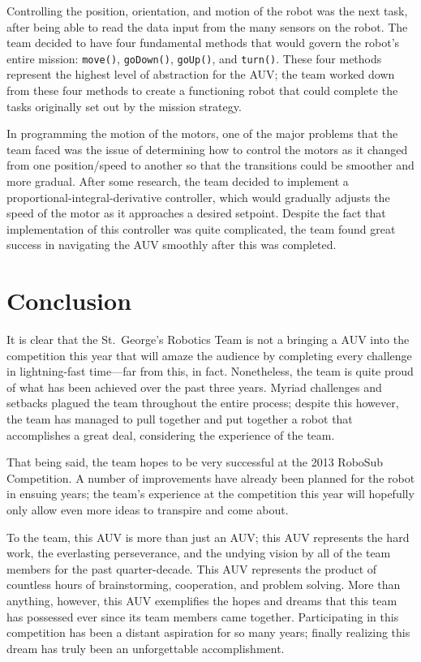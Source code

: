 \documentclass[12pt, letterpaper, twocolumn, titlepage]{article}
\begin{document}
Controlling the position, orientation, and motion of the robot was the next task, after being able to read the data input from the many sensors on the robot. The team decided to have four fundamental methods that would govern the robot's entire mission: \texttt{move()}, \texttt{goDown()}, \texttt{goUp()}, and \texttt{turn()}. These four methods represent the highest level of abstraction for the AUV; the team worked down from these four methods to create a functioning robot that could complete the tasks originally set out by the mission strategy.

In programming the motion of the motors, one of the major problems that the team faced was the issue of determining how to control the motors as it changed from one position/speed to another so that the transitions could be smoother and more gradual. After some research, the team decided to implement a proportional-integral-derivative controller, which would gradually adjusts the speed of the motor as it approaches a desired setpoint. Despite the fact that implementation of this controller was quite complicated, the team found great success in navigating the AUV smoothly after this was completed.

\section{Conclusion}

It is clear that the St.~George's Robotics Team is not a bringing a AUV into the competition this year that will amaze the audience by completing every challenge in lightning-fast time---far from this, in fact. Nonetheless, the team is quite proud of what has been achieved over the past three years. Myriad challenges and setbacks plagued the team throughout the entire process; despite this however, the team has managed to pull together and put together a robot that accomplishes a great deal, considering the experience of the team.

That being said, the team hopes to be very successful at the 2013 RoboSub Competition. A number of improvements have already been planned for the robot in ensuing years; the team's experience at the competition this year will hopefully only allow even more ideas to transpire and come about.

To the team, this AUV is more than just an AUV; this AUV represents the hard work, the everlasting perseverance, and the undying vision by all of the team members for the past quarter-decade. This AUV represents the product of countless hours of brainstorming, cooperation, and problem solving. More than anything, however, this AUV exemplifies the hopes and dreams that this team has possessed ever since its team members came together. Participating in this competition has been a distant aspiration for so many years; finally realizing this dream has truly been an unforgettable accomplishment.
\end{document}
